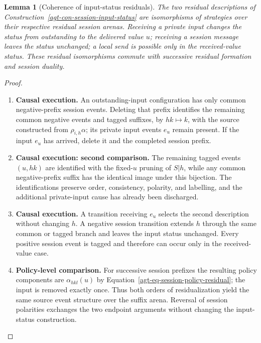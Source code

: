 \documentclass[11pt,a4paper]{article}
\numberwithin{equation}{section}
\newtheorem{lemma}[theorem]{Lemma}
\theoremstyle{definition}
\theoremstyle{remark}
\theoremstyle{plain}
\begin{document}
\begin{lemma}[Coherence of input-status residuals]
\label{agt-lem-session-input-residual}
The two residual descriptions of
Construction~\ref{agt-con-session-input-status} are isomorphisms of
strategies over their respective residual session arenas.  Receiving a
private input changes the status from outstanding to the delivered value
$u$; receiving a session message leaves the status unchanged; a local
send is possible only in the received-value status.  These residual
isomorphisms commute with successive residual formation and session
duality.
\end{lemma}

\begin{proof}
\leavevmode
\begin{enumerate}[label=\textup{(\arabic*)},leftmargin=*,itemsep=4pt,topsep=3pt]
  \item \textbf{Causal execution.} An outstanding-input configuration has only common negative-prefix
session events. Deleting that prefix identifies the remaining common
negative events and tagged suffixes, by $hk\mapsto k$, with the source
constructed from $\rho_{i,h}\alpha$; its private input events $e_u$
remain present. If the input $e_u$ has arrived, delete it and the
completed session prefix.
  \item \textbf{Causal execution: second comparison.} The remaining tagged events $(u,hk)$ are
identified with the fixed-$u$ pruning of $S|h$, while any common
negative-prefix suffix has the identical image under this bijection. The identifications preserve order, consistency, polarity, and labelling,
and the additional private-input cause has already been discharged.
  \item \textbf{Causal execution.} A transition receiving $e_u$ selects the second description without
changing $h$. A negative session transition extends $h$ through the
same common or tagged branch and leaves the input status unchanged. Every positive session event is tagged and therefore can occur only in
the received-value case.
  \item \textbf{Policy-level comparison.} For successive session prefixes the resulting
policy components are
$\alpha_{hkl}(u)$ by
Equation~\eqref{agt-eq-session-policy-residual}; the input is removed
exactly once. Thus both orders of residualization yield the same
source event structure over the suffix arena. Reversal of session
polarities exchanges the two endpoint arguments without changing the
input-status construction.
\end{enumerate}
\end{proof}
\end{document}
